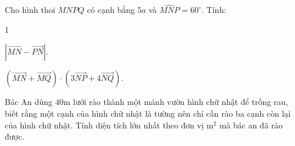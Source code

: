 \begin{ex}
\TL
\begin{ex}
Cho hình thoi $MNPQ$ có cạnh bằng $5a$ và $\widehat{MNP}=60^\circ$. Tính:
\begin{enumEX}[a)]{1}
\item $|\overrightarrow{MN}-\overrightarrow{PN}|$.
\item $(\overrightarrow{MN}+\overrightarrow{MQ})\cdot(3 \overrightarrow{NP}+4\overrightarrow{NQ})$.
\end{enumEX}
\end{ex}
\begin{ex}%
	Bác An dùng $40$m lưới rào thành một mảnh vườn hình chữ nhật để trồng rau, biết rằng một cạnh của hình chữ nhật là tường nên chỉ cần rào ba cạnh còn lại của hình chữ nhật. Tính diện tích lớn nhất theo đơn vị m$^2$ mà bác an đã rào được.
\end{ex}


\end{ex}
